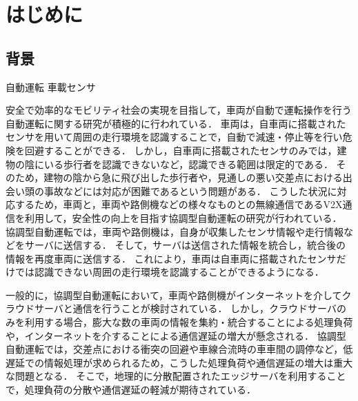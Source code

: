 \documentclass[a4paper,11pt,uplatex]{ujreport}
\begin{document}
\setcounter{page}{0}

\tableofcontents

\clearpage


\chapter{はじめに}
\label{chap:Introduction}


\section{背景}
\label{sec:背景}

    自動運転
    車載センサ

    安全で効率的なモビリティ社会の実現を目指して，車両が自動で運転操作を行う自動運転に関する研究が積極的に行われている\cite{AD}．
    車両は，自車両に搭載されたセンサを用いて周囲の走行環境を認識することで，自動で減速・停止等を行い危険を回避することができる．
    しかし，自車両に搭載されたセンサのみでは，建物の陰にいる歩行者を認識できないなど，認識できる範囲は限定的である．
    そのため，建物の陰から急に飛び出した歩行者や，見通しの悪い交差点における出会い頭の事故などには対応が困難であるという問題がある．
    こうした状況に対応するため，車両と，車両や路側機などの様々なものとの無線通信であるV2X通信を利用して，安全性の向上を目指す協調型自動運転の研究が行われている\cite{CAD, ITS}．
    協調型自動運転では，車両や路側機は，自身が収集したセンサ情報や走行情報などをサーバに送信する．
    そして，サーバは送信された情報を統合し，統合後の情報を再度車両に送信する．
    これにより，車両は自車両に搭載されたセンサだけでは認識できない周囲の走行環境を認識することができるようになる．\par
    一般的に，協調型自動運転において，車両や路側機がインターネットを介してクラウドサーバと通信を行うことが検討されている．
    しかし，クラウドサーバのみを利用する場合，膨大な数の車両の情報を集約・統合することによる処理負荷や，インターネットを介することによる通信遅延の増大が懸念される．
    協調型自動運転では，交差点における衝突の回避や車線合流時の車車間の調停など，低遅延での情報処理が求められるため，こうした処理負荷や通信遅延の増大は重大な問題となる．
    そこで，地理的に分散配置されたエッジサーバを利用することで，処理負荷の分散や通信遅延の軽減が期待されている\cite{edge}．
\end{document}
